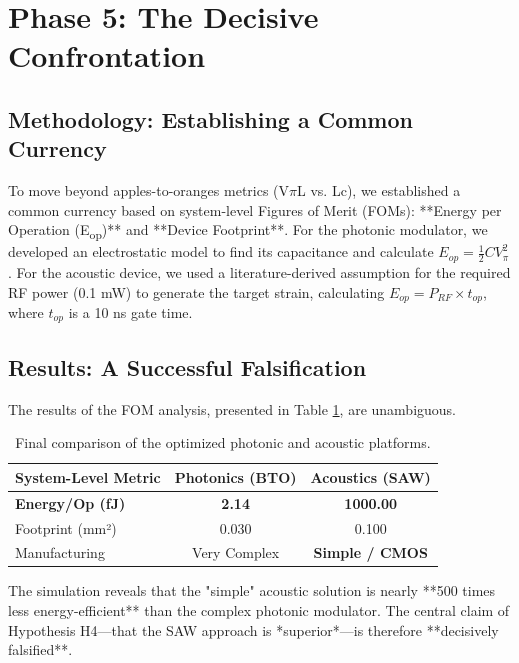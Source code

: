 \documentclass{article}
\begin{document}
\section{Phase 5: The Decisive Confrontation}
\subsection{Methodology: Establishing a Common Currency}
To move beyond apples-to-oranges metrics (V$\pi$L vs. Lc), we established a common currency based on system-level Figures of Merit (FOMs): **Energy per Operation (E\textsubscript{op})** and **Device Footprint**. For the photonic modulator, we developed an electrostatic model to find its capacitance and calculate $E_{op} = \frac{1}{2}CV_{\pi}^2$. For the acoustic device, we used a literature-derived assumption for the required RF power (0.1 mW) to generate the target strain, calculating $E_{op} = P_{RF} \times t_{op}$, where $t_{op}$ is a 10 ns gate time.

\subsection{Results: A Successful Falsification}
The results of the FOM analysis, presented in Table \ref{tab:final_comp}, are unambiguous.

\begin{table}[H]
\caption{Final comparison of the optimized photonic and acoustic platforms.}
\label{tab:final_comp}
\centering
\begin{tabular}{lcc}
\toprule
\textbf{System-Level Metric} & \textbf{Photonics (BTO)} & \textbf{Acoustics (SAW)} \\
\midrule
\textbf{Energy/Op (fJ)} & \textbf{2.14} & \textbf{1000.00} \\
Footprint (mm²) & 0.030 & 0.100 \\
Manufacturing & Very Complex & \textbf{Simple / CMOS} \\
\bottomrule
\end{tabular}
\end{table}

The simulation reveals that the "simple" acoustic solution is nearly **500 times less energy-efficient** than the complex photonic modulator. The central claim of Hypothesis H4—that the SAW approach is *superior*—is therefore **decisively falsified**.

\end{document}
